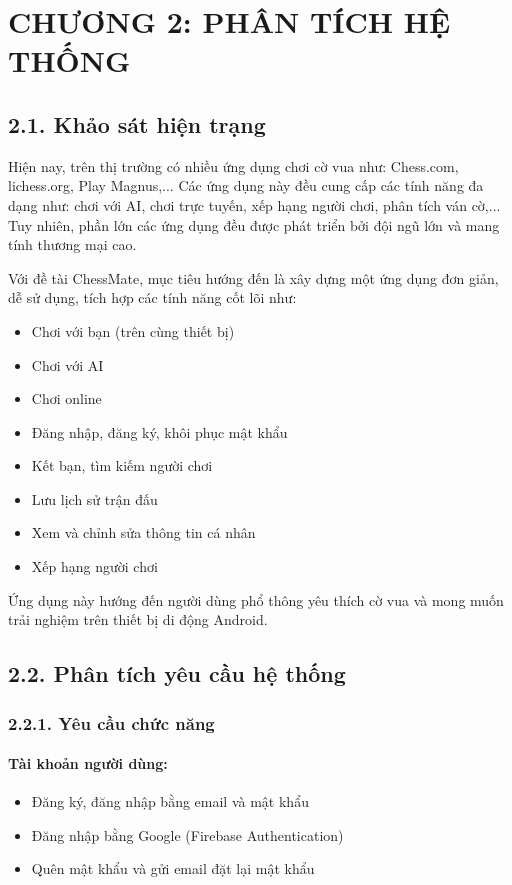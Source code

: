 \documentclass[a4paper,12pt]{article}
\begin{document}
\section*{\centering \textbf{CHƯƠNG 2: PHÂN TÍCH HỆ THỐNG}} %

\subsection*{2.1. Khảo sát hiện trạng} %

\justify
\noindent Hiện nay, trên thị trường có nhiều ứng dụng chơi cờ vua như: Chess.com, lichess.org, Play Magnus,... Các ứng dụng này đều cung cấp các tính năng đa dạng như: chơi với AI, chơi trực tuyến, xếp hạng người chơi, phân tích ván cờ,... Tuy nhiên, phần lớn các ứng dụng đều được phát triển bởi đội ngũ lớn và mang tính thương mại cao.

\noindent Với đề tài ChessMate, mục tiêu hướng đến là xây dựng một ứng dụng đơn giản, dễ sử dụng, tích hợp các tính năng cốt lõi như:
\begin{itemize}[label=·]
    \item Chơi với bạn (trên cùng thiết bị)
    \item Chơi với AI
    \item Chơi online
    \item Đăng nhập, đăng ký, khôi phục mật khẩu
    \item Kết bạn, tìm kiếm người chơi
    \item Lưu lịch sử trận đấu
    \item Xem và chỉnh sửa thông tin cá nhân
    \item Xếp hạng người chơi
\end{itemize}
\noindent Ứng dụng này hướng đến người dùng phổ thông yêu thích cờ vua và mong muốn trải nghiệm trên thiết bị di động Android.

\subsection*{2.2. Phân tích yêu cầu hệ thống} %
\subsubsection*{2.2.1. Yêu cầu chức năng} %

\paragraph{Tài khoản người dùng:} %
\begin{itemize}[label=·]
    \item Đăng ký, đăng nhập bằng email và mật khẩu
    \item Đăng nhập bằng Google (Firebase Authentication)
    \item Quên mật khẩu và gửi email đặt lại mật khẩu
\end{itemize}
\end{document}
